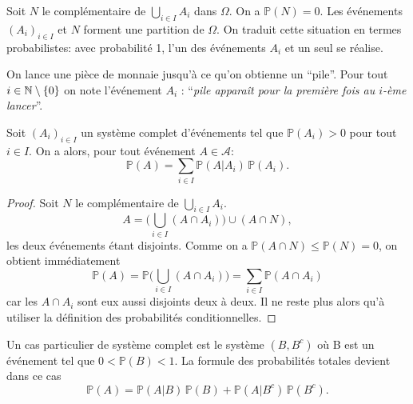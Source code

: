 Soit $N$ le complémentaire de $\bigcup_{i \in I} A_i$ dans $\Omega$. On a $\mathbb{P} (N) = 0$. Les événements $(A_i)_{i \in I}$ et $N$ forment une partition de $\Omega$. On traduit cette situation en termes probabilistes: avec probabilité 1, l'un des événements $A_i$ et un seul se réalise.

\begin{exemple}
	On lance une pièce de monnaie jusqu'à ce qu'on obtienne un ``pile''. Pour tout $i\in\mathbb{N} \setminus \left\{ 0 \right\}$ on note l'événement $A_i$ : ``\textit{pile apparaît pour la première fois au $i$-ème lancer}''. \pl{\rep{2cm}}
\end{exemple}

\sld{\vfill\pagebreak[5]}%


\begin{theorem} \label{th.probtot}
Soit $(A_i)_{i \in I}$ un système complet d'événements tel que $\mathbb{P} (A_i) >0$ pour tout $i \in I$. On a alors, pour tout événement $A \in \mathcal{A}$:
$$ \mathbb{P} (A) = \sum_{i \in I} \mathbb{P} (A | A_i) \, \mathbb{P} (A_i) .$$
\end{theorem}

\begin{proof}
	 Soit $N$ le complémentaire de $\bigcup_{i \in I} A_i$.
$$ A = \Big( \bigcup_{i \in I} (A \cap A_i) \Big) \cup (A \cap N) ,$$
les deux événements étant disjoints. Comme on a $\mathbb{P} (A \cap N) \leq \mathbb{P} (N) = 0$, on obtient immédiatement
$$ \mathbb{P} (A) = \mathbb{P} \Big( \bigcup_{i \in I} (A \cap A_i) \Big)  = \sum_{i \in I} \mathbb{P}(A \cap A_i) $$
car les $A \cap A_i$ sont eux aussi disjoints deux à deux. Il ne reste plus alors qu'à utiliser la définition des probabilités conditionnelles.
\end{proof}

\begin{remark}
	Un cas particulier de système complet est le système $(B, B^c)$ où B est un événement tel que $0< \mathbb{P} (B) < 1$. La formule des probabilités totales devient dans ce cas
	\[
		\mathbb{P} (A) = \mathbb{P} (A | B) \, \mathbb{P} (B) + \mathbb{P} (A | B^c) \, \mathbb{P} (B^c).\]
\end{remark}

